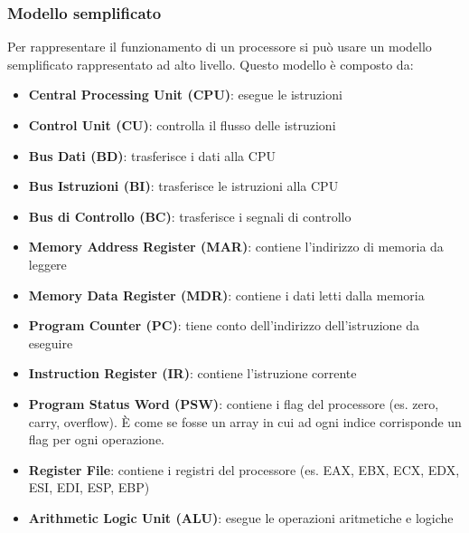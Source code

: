 \documentclass[a4paper]{article}
\theoremstyle{break}
\theoremstyle{break}
\theoremstyle{break}
\theoremstyle{break}
\begin{document}
\subsubsection{Modello semplificato}
Per rappresentare il funzionamento di un processore si può usare un modello semplificato
rappresentato ad alto livello. Questo modello è composto da:
\begin{itemize}
	\item \textbf{Central Processing Unit (CPU)}: esegue le istruzioni
	\item \textbf{Control Unit (CU)}: controlla il flusso delle istruzioni
	\item \textbf{Bus Dati (BD)}: trasferisce i dati alla CPU
	\item \textbf{Bus Istruzioni (BI)}: trasferisce le istruzioni alla CPU
	\item \textbf{Bus di Controllo (BC)}: trasferisce i segnali di controllo
	\item \textbf{Memory Address Register (MAR)}: contiene l'indirizzo di memoria da leggere
	\item \textbf{Memory Data Register (MDR)}: contiene i dati letti dalla memoria
	\item \textbf{Program Counter (PC)}: tiene conto dell'indirizzo dell'istruzione da eseguire
	\item \textbf{Instruction Register (IR)}: contiene l'istruzione corrente
	\item \textbf{Program Status Word (PSW)}: contiene i flag del processore (es. zero, carry, overflow).
	      È come se fosse un array in cui ad ogni indice corrisponde un flag per ogni operazione.
	\item \textbf{Register File}: contiene i registri del processore (es. EAX, EBX, ECX, EDX, ESI, EDI, ESP, EBP)
	\item \textbf{Arithmetic Logic Unit (ALU)}: esegue le operazioni aritmetiche e logiche
\end{itemize}
\end{document}
